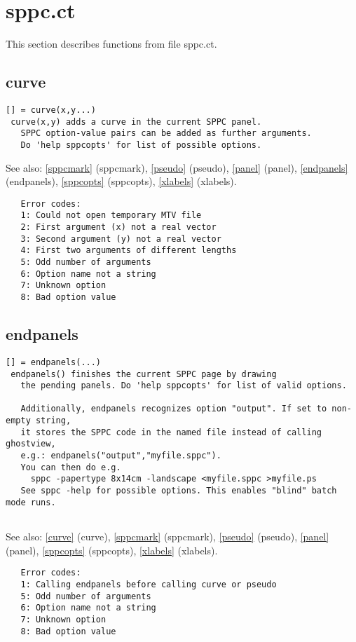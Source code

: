 \documentclass[a4paper]{article}
\begin{document}
\section{sppc.ct}

This section describes functions from file sppc.ct.




\subsection{curve\label{curve}}

\begin{tscreen}
\begin{verbatim}
[] = curve(x,y...)
 curve(x,y) adds a curve in the current SPPC panel.
   SPPC option-value pairs can be added as further arguments.
   Do 'help sppcopts' for list of possible options.
\end{verbatim}

See also: \ref{sppcmark} {(sppcmark)}, \ref{pseudo} {(pseudo)}, \ref{panel} {(panel)}, \ref{endpanels} {(endpanels)}, \ref{sppcopts} {(sppcopts)}, \ref{xlabels} {(xlabels)}.
\begin{verbatim}
   Error codes:
   1: Could not open temporary MTV file
   2: First argument (x) not a real vector
   3: Second argument (y) not a real vector
   4: First two arguments of different lengths
   5: Odd number of arguments
   6: Option name not a string
   7: Unknown option
   8: Bad option value
\end{verbatim}
\end{tscreen}



\subsection{endpanels\label{endpanels}}

\begin{tscreen}
\begin{verbatim}
[] = endpanels(...)
 endpanels() finishes the current SPPC page by drawing
   the pending panels. Do 'help sppcopts' for list of valid options.
   
   Additionally, endpanels recognizes option "output". If set to non-empty string,
   it stores the SPPC code in the named file instead of calling ghostview,
   e.g.: endpanels("output","myfile.sppc").
   You can then do e.g.
     sppc -papertype 8x14cm -landscape <myfile.sppc >myfile.ps
   See sppc -help for possible options. This enables "blind" batch mode runs.
   
\end{verbatim}

See also: \ref{curve} {(curve)}, \ref{sppcmark} {(sppcmark)}, \ref{pseudo} {(pseudo)}, \ref{panel} {(panel)}, \ref{sppcopts} {(sppcopts)}, \ref{xlabels} {(xlabels)}.
\begin{verbatim}
   Error codes:
   1: Calling endpanels before calling curve or pseudo
   5: Odd number of arguments
   6: Option name not a string
   7: Unknown option
   8: Bad option value
\end{verbatim}
\end{tscreen}
\end{document}

